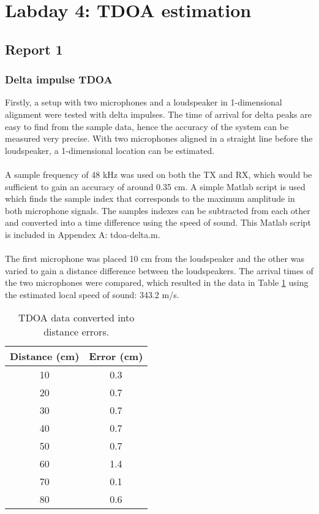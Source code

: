 \documentclass[final]{scrreprt} %
\begin{document}
\section{Labday 4: TDOA estimation}
\subsection{Report 1}
\subsubsection{Delta impulse TDOA}
Firstly, a setup with two microphones and a loudspeaker in 1-dimensional alignment were tested with delta impulses.
The time of arrival for delta peaks are easy to find from the sample data, hence the accuracy of the system can be measured very precise.
With two microphones aligned in a straight line before the loudspeaker, a 1-dimensional location can be estimated.
\\ \\
A sample frequency of 48 kHz was used on both the TX and RX, which would be sufficient to gain an accuracy of around 0.35 cm.
A simple Matlab script is used which finds the sample index that corresponds to the maximum amplitude in both microphone signals.
The samples indexes can be subtracted from each other and converted into a time difference using the speed of sound.
This Matlab script is included in Appendex A: tdoa-delta.m.
\\ \\
The first microphone was placed 10 cm from the loudspeaker and the other was varied to gain a distance difference between the loudspeakers.
The arrival times of the two microphones were compared, which resulted in the data in Table \ref{tab:delta} using the estimated local speed of sound: 343.2 m/s.

\begin{table} [H]
	\centering
	\begin{tabular} { c | c }
	Distance (cm) & Error (cm) \\ \hline
	10 & 0.3 \\
	20 & 0.7 \\
	30 & 0.7 \\
	40 & 0.7 \\
	50 & 0.7 \\
	60 & 1.4 \\
	70 & 0.1 \\
	80 & 0.6 \\
	\end{tabular}
\caption{TDOA data converted into distance errors.}
\label{tab:delta}
\end{table}
\end{document}
